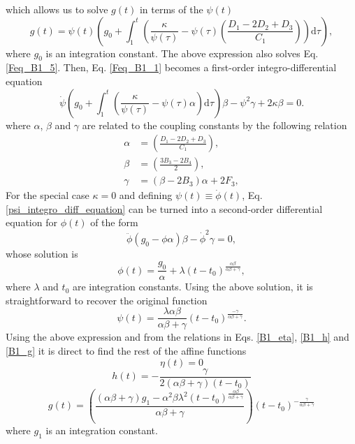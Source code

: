which allows us to solve $g(t)$ in terms of the $\psi(t)$ 
\begin{equation}
    \label{B1_g}
    g(t) = \psi(t) \left(g_0 + \int_1^t \left(\frac{\kappa}{\psi(\tau)} - \psi(\tau) \left(\frac{D_1 - 2D_2 + D_3}{C_1}\right)\right) \mathrm{d}\tau\right),
\end{equation}
where $g_0$ is an integration constant. The above expression also solves Eq. \eqref{Feq_B1_5}. Then, Eq. \eqref{Feq_B1_1} becomes a first-order integro-differential equation 
\begin{dmath}
    \label{psi_integro_diff_equation}
    \dot{\psi}\left(g_0 + \int_1^t \left(\frac{\kappa}{\psi(\tau)} - \psi(\tau) \alpha\right) \mathrm{d}\tau\right)\beta -
    \psi^2 \gamma + 2\kappa\beta = 0.
\end{dmath}
where $\alpha$, $\beta$ and $\gamma$ are related to the coupling constants
by the following relation
\begin{align}
    \alpha & = \left(\frac{D_1 - 2D_2 + D_3}{C_1}\right), \\
    \beta & = \left(\frac{3B_3 - 2B_4}{2}\right), \\
    \gamma & = \left(\beta - 2B_3\right)\alpha + 2F_3,
\end{align}
For the special case $\kappa = 0$ and defining $\psi (t) \equiv \dot{\phi}(t)$, Eq.\eqref{psi_integro_diff_equation} can be turned into a second-order differential equation for $\phi(t)$ of the form
\begin{dmath}
    \ddot{\phi}\left(g_0  - \phi\alpha\right)\beta - \dot{\phi}^2 \gamma  = 0,
\end{dmath}
whose solution is
\begin{equation}
    \phi(t) =\frac{g_0}{\alpha} + \lambda\left(t -t_0\right)^{\frac{\alpha\beta}{\alpha\beta + \gamma}},
\end{equation}
where $\lambda $ and $t_0$ are integration constants. Using the above solution, it is straightforward to recover the original function
\begin{equation}
    \psi(t) =\frac{ \lambda\alpha\beta}{\alpha\beta + \gamma}\left(t -t_0\right)^{\frac{-\gamma}{\alpha\beta + \gamma}}.
\end{equation}
Using the above expression and from the relations in Eqs. \eqref{B1_eta}, \eqref{B1_h} and \eqref{B1_g} it is direct to find the rest of the
affine functions
\begin{dmath}
\eta(t)  = 0
\end{dmath}
\begin{dmath}
h(t) =  -\frac{\gamma}{2\left(\alpha\beta + \gamma\right)\left(t - t_0\right)}
\end{dmath}
\begin{dmath}
g(t) =\left(\frac{(\alpha\beta + \gamma)g_1 - \alpha^2\beta\lambda^2 \left(t - t_0\right)^{\frac{\alpha\beta}{\alpha\beta + \gamma}}}{\alpha\beta + \gamma}\right)\left(t - t_0\right)^{-\frac{\gamma}{\alpha\beta + \gamma}}
\end{dmath}
where $g_1$ is an integration constant.


